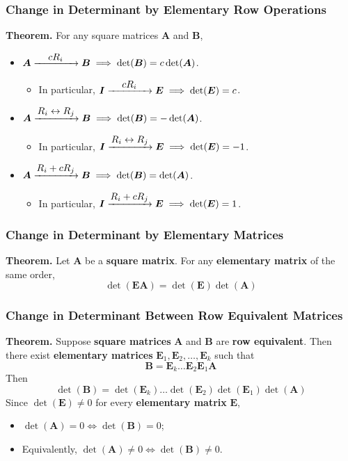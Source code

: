 \documentclass[../ma2001_notes.tex]{subfiles}
\begin{document}
\subsubsection{Change in Determinant by Elementary Row Operations}
\textbf{Theorem.} For any square matrices \(\bm{A}\) and \(\bm{B}\),
\begin{itemize}
	\item\(\bm{A}\ro{$$cR_i$$}\bm{B}\implies\det(\bm{B})=c\det(\bm{A})\).
	\begin{itemize}
		\item In particular, \(\bm{I}\ro{$$cR_i$$}\bm{E}\implies\det(\bm{E})=c\).
	\end{itemize}
	\item\(\bm{A}\ro{$$R_i\leftrightarrow R_j$$}\bm{B}\implies\det(\bm{B})=-\det(\bm{A})\).
	\begin{itemize}
		\item In particular, \(\bm{I}\ro{$$R_i\leftrightarrow R_j$$}\bm{E}\implies\det(\bm{E})=-1\).
	\end{itemize}
	\item\(\bm{A}\ro{$$R_i+cR_j$$}\bm{B}\implies\det(\bm{B})=\det(\bm{A})\).
	\begin{itemize}
		\item In particular, \(\bm{I}\ro{$$R_i+cR_j$$}\bm{E}\implies\det(\bm{E})=1\).
	\end{itemize}
\end{itemize}

\subsubsection{Change in Determinant by Elementary Matrices}
\textbf{Theorem.} Let \(\bm{A}\) be a \textbf{square matrix}. For any \textbf{elementary matrix} of the same order,
\[\det(\bm{EA})=\det(\bm{E})\det(\bm{A})\]

\subsubsection{Change in Determinant Between Row Equivalent Matrices}
\textbf{Theorem.} Suppose \textbf{square matrices} \(\bm{A}\) and \(\bm{B}\) are \textbf{row equivalent}. Then there exist \textbf{elementary matrices} \(\bm{E}_1, \bm{E}_2, \ldots, \bm{E}_k\) such that
\[\bm{B}=\bm{E}_k\ldots\bm{E}_2\bm{E}_1\bm{A}\]
Then
\[\det(\bm{B})=\det(\bm{E}_k)\ldots\det(\bm{E}_2)\det(\bm{E}_1)\det(\bm{A})\]
Since \(\det(\bm{E})\ne0\) for every \textbf{elementary matrix} \(\bm{E}\),
\begin{itemize}
	\item\(\det(\bm{A})=0\iff\det(\bm{B})=0\);
	\item Equivalently, \(\det(\bm{A})\ne0\iff\det(\bm{B})\ne0\).
\end{itemize}
\end{document}
